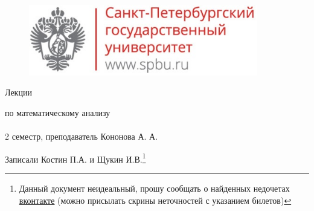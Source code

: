 \documentclass[main]{subfiles}
\begin{document}
	\begin{figure}[H]
			\includegraphics[width=10cm]{../../../template/spsu.jpg}
			\centering
	\end{figure}
	\vspace*{\fill}
	\begin{center}
		\huge Лекции

		\huge по математическому анализу\\ \ \\
		\Large 2 семестр, преподаватель Кононова А. А.

		\large Записали Костин П.А. и Щукин И.В.\footnote{Данный документ неидеальный, прошу сообщать о найденных недочетах \href{https://vk.com/drab_existence_a}{вконтакте} (можно присылать скрины неточностей с указанием билетов)}
	\end{center}
	\vspace*{\fill}
	\vspace*{\fill}

	\newpage
	\tableofcontents
	\newpage
\end{document}
